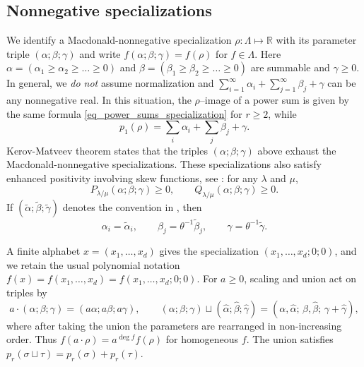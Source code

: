 \documentclass[11pt,reqno]{amsart}
\theoremstyle{definition}
\theoremstyle{remark}
\numberwithin{equation}{section}
\begin{document}
\subsection{Nonnegative specializations}\label{sec:specializations}

We identify a Macdonald-nonnegative specialization $\rho:\Lambda\mapsto \mathbb R$ with its parameter triple
$(\alpha;\beta;\gamma)$ and write
$f(\alpha;\beta;\gamma)=f(\rho)$ for $f\in\Lambda$.
Here $\alpha=(\alpha_1\ge \alpha_2\ge\dots\ge 0)$ and $\beta=(\beta_1\ge \beta_2\ge \dots\ge 0)$ are summable and $\gamma\ge0$. In general, we \emph{do not} assume normalization and $ \sum_{i=1}^{\infty}\alpha_i+\sum_{j=1}^{\infty}\beta_j+\gamma$ can be any nonnegative real.
In this situation, the $\rho$--image of a power sum is given by the same formula
\eqref{eq_power_sums_specialization} for $r\ge2$, while
\begin{equation}\label{eq_specialization_mass}
 p_1(\rho)=\sum_i\alpha_i+\sum_j\beta_j+\gamma.
\end{equation}
Kerov-Matveev theorem \cite[Theorem 1.4]{Mat19} states that the triples $(\alpha;\beta;\gamma)$ above
exhaust the Macdonald-nonnegative specializations. These specializations also satisfy enhanced positivity involving skew functions, see \cite[Section 2.2.1]{BC14}: for any $\lambda$ and $\mu$,
\begin{equation}
\label{eq_enhanced_positivity}
 P_{\lambda/\mu}(\alpha;\beta;\gamma)\ge 0, \qquad Q_{\lambda/\mu}(\alpha;\beta;\gamma)\ge 0.
\end{equation}
If $(\widetilde\alpha;\widetilde\beta;\widetilde\gamma)$ denotes the
convention in \cite{BC14,BP15,Mat19}, then
\begin{equation}\label{eq:parameter-conversion}
 \alpha_i=\widetilde\alpha_i,\qquad
 \beta_j=\theta^{-1}\widetilde\beta_j,\qquad
 \gamma=\theta^{-1}\widetilde\gamma.
\end{equation}

A finite alphabet $x=(x_1,\ldots,x_d)$ gives the specialization
$(x_1,\ldots,x_d;0;0)$, and we retain the usual polynomial notation
$f(x)=f(x_1,\ldots,x_d)=f(x_1,\ldots,x_d;0;0)$. For $a\ge0$, scaling and union act on triples by
\begin{equation}\label{eq:specialization-operations}
 a\cdot(\alpha;\beta;\gamma)=(a\alpha;a\beta;a\gamma),\qquad
 (\alpha;\beta;\gamma)\sqcup(\widehat\alpha;\widehat\beta;\widehat\gamma)
 =(\alpha,\widehat\alpha;\, \beta,\widehat\beta;\, \gamma+\widehat\gamma),
\end{equation}
where after taking the union the parameters are rearranged in non-increasing order.
Thus $f(a\cdot\rho)=a^{\deg f}f(\rho)$ for homogeneous $f$.
The union satisfies $p_r(\sigma\sqcup\tau)=p_r(\sigma)+p_r(\tau)$.
\end{document}

